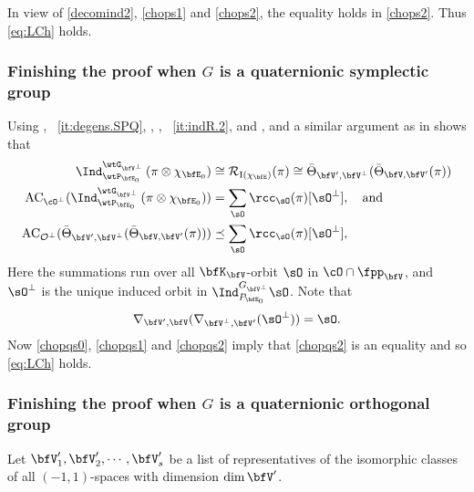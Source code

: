 \documentclass[12pt,a4paper]{amsart}
\newcommand{\AC}{\mathrm{AC}}
\def\AC{\mathrm{AC}}
\newcommand{\CO}{{\mathcal {O}}}
\newcommand{\CR}{{\mathcal {R}}}
\newcommand{\RI}{{\mathrm {I}}}
\def\DD{\nabla}
\numberwithin{equation}{section}
\theoremstyle{remark}
\def\abfV{\bfV'}
\def\Thetab{\bar{\Theta}}
\def\sOpe{\sO^\perp}
\def\bfVpe{\bfV^\perp}
\begin{document}
In view of \cref{decomind2}, \cref{chops1} and \cref{chops2},
the equality holds in \eqref{chops2}. Thus \cref{eq:LCh} holds. %


\subsubsection{Finishing the proof when $G$ is a quaternionic symplectic group}

Using , ~\ref{it:degens.SPQ}, , ,
~\ref{it:indR.2}, \cite[Theorem~1.4]{SV} and , and a
similar argument as in  shows that
\begin{align}\label{chopqs0}
  \Ind_{\wtP_{\bfE_0}}^{\wtG_{\bfVpe}} \left(\pi\otimes
  \chi_{\bfE_0}\right) & \cong \CR_{\RI(\chi_{\bfE})} (\pi)\cong \Thetab_{\abfV,\bfVpe}(\Thetab_{\bfV,\abfV}(\pi))\\
  \label{chopqs1}
  \AC_{\cO^\perp}(\Ind_{\wtP_{\bfE_0}}^{\wtG_{\bfVpe}} \left(\pi\otimes
  \chi_{\bfE_0}\right))
  &  = \sum_{\sO} \rcc_\sO(\pi) [\sOpe ], \quad \text{and}\\
  \label{chopqs2}
  \AC_{\CO^\perp}(\Thetab_{\abfV,\bfVpe}(\Thetab_{\bfV,\abfV}(\pi))) &\preceq \sum_{\sO} \rcc_\sO(\pi) [\sOpe ],
\end{align}
  Here
  the summations run over all
  $\bfK_{\bfV}$-orbit $\sO$ in  $\cO\cap \fpp_{\bfV}$, and $\sOpe$ is the unique induced orbit in $\Ind_{P_{\bfE_0}}^{G_{\bfVpe}}\sO$.
  Note that
   \[
 \DD_{\abfV,\bfV} (\DD_{\bfVpe,\abfV}(\sO^\perp))=\sO.
\]
Now \eqref{chopqs0}, \eqref{chopqs1} and \eqref{chopqs2}
imply that \eqref{chopqs2} is an equality and so \cref{eq:LCh} holds.


\subsubsection{Finishing the proof when $G$ is a quaternionic orthogonal group}


Let $\abfV_1, \abfV_2, \cdots, \abfV_s$ be a
list of representatives of the isomorphic  classes of all $(-1,
1)$-spaces with dimension $\dim \abfV$.
\end{document}
